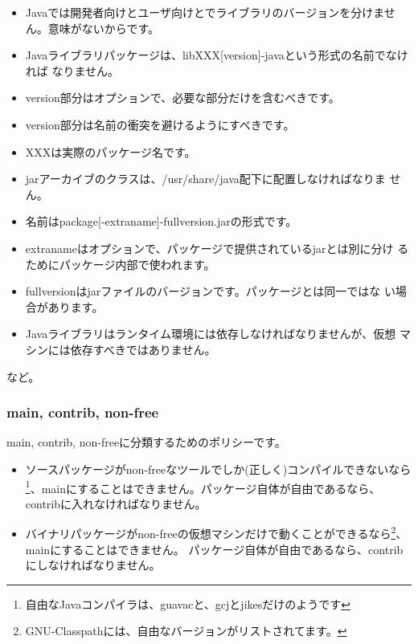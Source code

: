 \documentclass[mingoth,a4paper]{jsarticle}
\begin{document}
\begin{itemize}
\item Javaでは開発者向けとユーザ向けとでライブラリのバージョンを分けませ
      ん。意味がないからです。
\item Javaライブラリパッケージは、libXXX[version]-javaという形式の名前でなければ
      なりません。
\item version部分はオプションで、必要な部分だけを含むべきです。
\item version部分は名前の衝突を避けるようにすべきです。
\item XXXは実際のパッケージ名です。
\item jarアーカイブのクラスは、/usr/share/java配下に配置しなければなりま
      せん。
\item 名前はpackage[-extraname]-fullversion.jarの形式です。
\item extranameはオプションで、パッケージで提供されているjarとは別に分け
      るためにパッケージ内部で使われます。
\item fullversionはjarファイルのバージョンです。パッケージとは同一ではな
      い場合があります。
\item Javaライブラリはランタイム環境には依存しなければなりませんが、仮想
      マシンには依存すべきではありません。
\end{itemize}
など。

\subsubsection{main, contrib, non-free}
main, contrib, non-freeに分類するためのポリシーです。

\begin{itemize}
\item ソースパッケージがnon-freeなツールでしか(正しく)コンパイルできないなら\footnote{自由なJavaコンパイラは、guavacと、gcjとjikesだけのようです}、mainにすることはできません。パッケージ自体が自由であるなら、contribに入れなければなりません。
\item バイナリパッケージがnon-freeの仮想マシンだけで動くことができるなら\footnote{GNU-Classpathには、自由なバージョンがリストされてます。}、mainにすることはできません。 パッケージ自体が自由であるなら、contribにしなければなりません。
\end{itemize}
\end{document}
